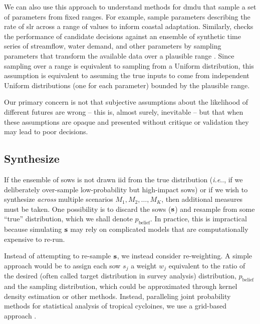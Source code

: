 \documentclass[11pt]{article}
\makeatletter
\DeclareRobustCommand\onedot{\futurelet\@let@token\@onedot}
\def\@onedot{\ifx\@let@token.\else.\null\fi\xspace}
\def\ie{\emph{i.e}\onedot} \def\Ie{\emph{I.e}\onedot}
\DeclareRobustCommand\onedot{\futurelet\@let@token\@onedot}
\def\@onedot{\ifx\@let@token.\else.\null\fi\xspace}
\def\ie{\emph{i.e}\onedot} \def\Ie{\emph{I.e}\onedot}
\makeatother
\begin{document}
We can also use this approach to understand methods for \gls{dmdu} that sample a set of parameters from fixed ranges.
For example, \citet{lempert_slr:2012} sample parameters describing the rate of \gls{slr} across a range of values to inform coastal adaptation.
Similarly, \citet{trindade_waterpathways:2020} checks the performance of candidate decisions against an ensemble of synthetic time series of streamflow, water demand, and other parameters by sampling parameters that transform the available data over a plausible range \citep[\ie, robustness metrics; see][for details]{mcphail_robustness:2019,herman:2015}.
Since sampling over a range is equivalent to sampling from a Uniform distribution, this assumption is equivalent to assuming the true inputs to come from independent Uniform distributions (one for each parameter) bounded by the plausible range.

Our primary concern is not that subjective assumptions about the likelihood of different futures are wrong -- this is, almost surely, inevitable -- but that when these assumptions are opaque and presented without critique or validation they may lead to poor decisions.

\subsection{Synthesize}\label{sec:analysis-synthesize}

If the ensemble of \glspl{sow} is not drawn \gls{iid} from the true distribution (\ie, if we deliberately over-sample low-probability but high-impact \glspl{sow}) or if we wish to synthesize \emph{across} multiple scenarios $M_1, M_2, \ldots, M_K$, then additional measures must be taken.
One possibility is to discard the \glspl{sow} ($\vb{s}$) and resample from some ``true'' distribution, which we shall denote $p_\mathrm{belief}$.
In practice, this is impractical because simulating $\vb{s}$ may rely on complicated models that are computationally expensive to re-run.

Instead of attempting to re-sample $\vb{s}$, we instead consider re-weighting.
A simple approach would be to assign each \gls{sow} $s_j$ a weight $w_j$ equivalent to the ratio of the desired (often called target distribution in survey analysis) distribution, $p_\mathrm{belief}$ and the sampling distribution, which could be approximated through kernel density estimation or other methods.
Instead, paralleling joint probability methods for statistical analysis of tropical cycloines, we use a grid-based approach \citep{johnson_clara:2013,resio_probabilities:2007,toro_jpm-os:2010}.
\end{document}
